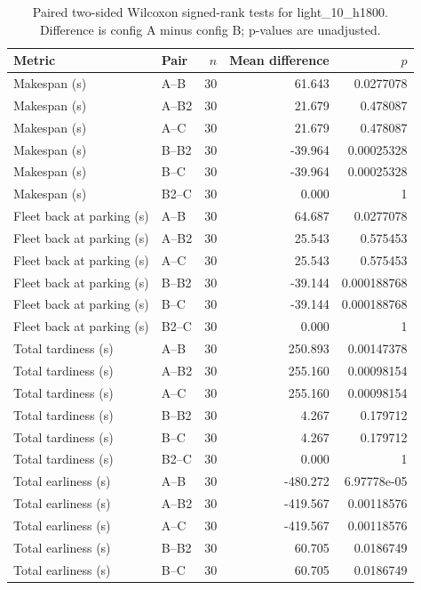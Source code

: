 \begin{table}[t]
\centering
\caption{Paired two-sided Wilcoxon signed-rank tests for light\_10\_h1800. Difference is config A minus config B; p-values are unadjusted.}
\label{tab:light-10-h1800-paired}
\begin{tabular}{llrrr}
\toprule
Metric & Pair & $n$ & Mean difference & $p$ \\
\midrule
Makespan (s) & A--B & 30 & 61.643 & 0.0277078 \\
Makespan (s) & A--B2 & 30 & 21.679 & 0.478087 \\
Makespan (s) & A--C & 30 & 21.679 & 0.478087 \\
Makespan (s) & B--B2 & 30 & -39.964 & 0.00025328 \\
Makespan (s) & B--C & 30 & -39.964 & 0.00025328 \\
Makespan (s) & B2--C & 30 & 0.000 & 1 \\
Fleet back at parking (s) & A--B & 30 & 64.687 & 0.0277078 \\
Fleet back at parking (s) & A--B2 & 30 & 25.543 & 0.575453 \\
Fleet back at parking (s) & A--C & 30 & 25.543 & 0.575453 \\
Fleet back at parking (s) & B--B2 & 30 & -39.144 & 0.000188768 \\
Fleet back at parking (s) & B--C & 30 & -39.144 & 0.000188768 \\
Fleet back at parking (s) & B2--C & 30 & 0.000 & 1 \\
Total tardiness (s) & A--B & 30 & 250.893 & 0.00147378 \\
Total tardiness (s) & A--B2 & 30 & 255.160 & 0.00098154 \\
Total tardiness (s) & A--C & 30 & 255.160 & 0.00098154 \\
Total tardiness (s) & B--B2 & 30 & 4.267 & 0.179712 \\
Total tardiness (s) & B--C & 30 & 4.267 & 0.179712 \\
Total tardiness (s) & B2--C & 30 & 0.000 & 1 \\
Total earliness (s) & A--B & 30 & -480.272 & 6.97778e-05 \\
Total earliness (s) & A--B2 & 30 & -419.567 & 0.00118576 \\
Total earliness (s) & A--C & 30 & -419.567 & 0.00118576 \\
Total earliness (s) & B--B2 & 30 & 60.705 & 0.0186749 \\
Total earliness (s) & B--C & 30 & 60.705 & 0.0186749 \\

\end{tabular}
\end{table}
